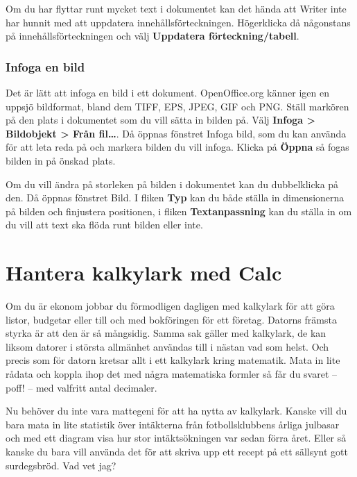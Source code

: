 \documentclass[a4paper,final]{memoir} %
\begin{document}

Om du har flyttar runt mycket text i dokumentet kan det hända att Writer inte har hunnit med att uppdatera innehållsförteckningen. Högerklicka då någonstans på innehållsförteckningen och välj \textbf{Uppdatera förteckning/tabell}.

\subsubsection{Infoga en bild}


Det är lätt att infoga en bild i ett dokument. OpenOffice.org känner igen en uppsjö bildformat, bland dem TIFF, EPS, JPEG, GIF och PNG. Ställ markören på den plats i dokumentet som du vill sätta in bilden på. Välj \textbf{Infoga \textgreater{} Bildobjekt \textgreater{} Från fil\ldots{}}. Då öppnas fönstret Infoga bild, som du kan använda för att leta reda på och markera bilden du vill infoga. Klicka på \textbf{Öppna} så fogas bilden in på önskad plats.

Om du vill ändra på storleken på bilden i dokumentet kan du dubbelklicka på den. Då öppnas fönstret Bild. I fliken \textbf{Typ} kan du både ställa in dimensionerna på bilden och finjustera positionen, i fliken \textbf{Textanpassning} kan du ställa in om du vill att text ska flöda runt bilden eller inte.


\section{Hantera kalkylark med Calc}


Om du är ekonom jobbar du förmodligen dagligen med kalkylark för att göra listor, budgetar eller till och med bokföringen för ett företag. Datorns främsta styrka är att den är så mångsidig. Samma sak gäller med kalkylark, de kan liksom datorer i största allmänhet användas till i nästan vad som helst. Och precis som för datorn kretsar allt i ett kalkylark kring matematik. Mata in lite rådata och koppla ihop det med några matematiska formler så får du svaret -- poff! -- med valfritt antal decimaler.

Nu behöver du inte vara mattegeni för att ha nytta av kalkylark. Kanske vill du bara mata in lite statistik över intäkterna från fotbollsklubbens årliga julbasar och med ett diagram visa hur stor intäktsökningen var sedan förra året. Eller så kanske du bara vill använda det för att skriva upp ett recept på ett sällsynt gott surdegsbröd. Vad vet jag?
\end{document}
